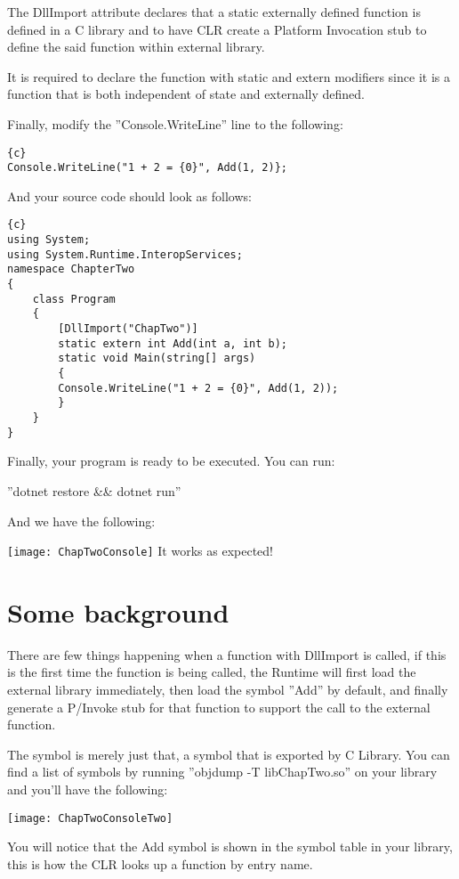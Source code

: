 The DllImport attribute declares that a static externally defined function is defined in a C library and to have CLR create a Platform Invocation stub to define the said function within external library.

It is required to declare the function with static and extern modifiers since it is a function that is both independent of state and externally defined.

Finally, modify the ''Console.WriteLine'' line to the following:

\begin{lstlisting}{c}
Console.WriteLine("1 + 2 = {0}", Add(1, 2)};
\end{lstlisting}
And your source code should look as follows:

\begin{lstlisting}{c}
using System;
using System.Runtime.InteropServices;
namespace ChapterTwo
{
	class Program
	{
		[DllImport("ChapTwo")]
		static extern int Add(int a, int b);
		static void Main(string[] args)
		{
		Console.WriteLine("1 + 2 = {0}", Add(1, 2));
		}
	}
}
\end{lstlisting}
\newpage
Finally, your program is ready to be executed. You can run:

''dotnet restore \&\& dotnet run''

And we have the following:

\texttt{[image: ChapTwoConsole]}
It works as expected!
\newpage
\section{Some background}
There are few things happening when a function with DllImport is called, if this is the first time the function is being called, the Runtime will first load the external library immediately, then load the symbol ''Add'' by default, and finally generate a P/Invoke stub for that function to support the call to the external function.

The symbol is merely just that, a symbol that is exported by C Library. You can find a list of symbols by running ''objdump -T libChapTwo.so'' on your library and you'll have the following:

\texttt{[image: ChapTwoConsoleTwo]}

You will notice that the Add symbol is shown in the symbol table in your library, this is how the CLR looks up a function by entry name.
